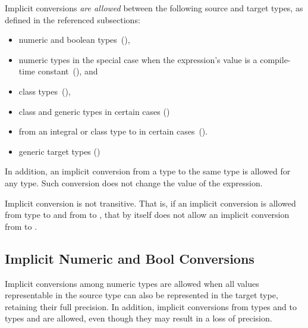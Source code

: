Implicit conversions \emph{are allowed} between
the following source and target types,
as defined in the referenced subsections:

\begin{itemize}
\item numeric and boolean types~(),
\item numeric types in the special case when the expression's value
      is a compile-time constant~(), and
\item class types~(),
\item class and generic types in certain cases ()
\item from an integral or class type to 
      in certain cases~().
\item generic target types ()
\end{itemize}

In addition,
an implicit conversion from a type to the same type is allowed for any type.
Such conversion does not change the value of the expression.

Implicit conversion is not transitive. That is, if an implicit conversion
is allowed from type  to  and from  to ,
that by itself does not allow an implicit conversion
from  to .

\subsection{Implicit Numeric and Bool Conversions}
\label{Implicit_NumBool_Conversions}

Implicit conversions among numeric types are allowed when
all values representable in the source type can also be represented
in the target type, retaining their full precision.
%
%
In addition, implicit conversions from
types  and  to types 
and  are allowed, even though they may result in a loss of
precision.

